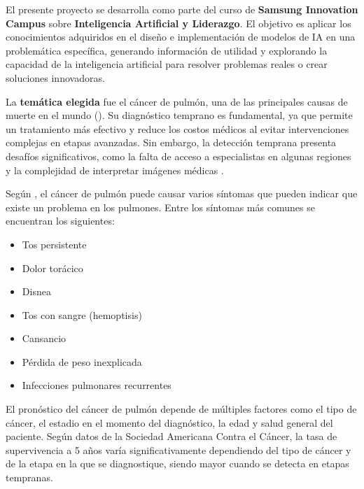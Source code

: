 El presente proyecto se desarrolla como parte del curso de \textbf{Samsung Innovation Campus} sobre \textbf{Inteligencia Artificial y Liderazgo}. El objetivo es aplicar los conocimientos adquiridos en el diseño e implementación de modelos de IA en una problemática específica, generando información de utilidad y explorando la capacidad de la inteligencia artificial para resolver problemas reales o crear soluciones innovadoras.

La \textbf{temática elegida} fue el cáncer de pulmón, una de las principales causas de muerte en el mundo (\cite{WHO2025}). Su diagnóstico temprano es fundamental, ya que permite un tratamiento más efectivo y reduce los costos médicos al evitar intervenciones complejas en etapas avanzadas. Sin embargo, la detección temprana presenta desafíos significativos, como la falta de acceso a especialistas en algunas regiones y la complejidad de interpretar imágenes médicas \parencite{OMS2017diagnosis}.


Según \textcite{MNT2025}, el cáncer de pulmón puede causar varios síntomas que pueden indicar que existe un problema en los pulmones.
Entre los síntomas más comunes se encuentran los siguientes:

\begin{itemize}
    \item Tos persistente
    \item Dolor torácico
    \item Disnea
    \item Tos con sangre (hemoptisis)
    \item Cansancio
    \item Pérdida de peso inexplicada
    \item Infecciones pulmonares recurrentes
\end{itemize}


El pronóstico del cáncer de pulmón depende de múltiples factores como el tipo de cáncer, el estadio en el momento del diagnóstico, la edad y salud general del paciente. Según datos de la Sociedad Americana Contra el Cáncer\parencite{ACS2025}, la tasa de supervivencia a 5 años varía significativamente dependiendo del tipo de cáncer y de la etapa en la que se diagnostique, siendo mayor cuando se detecta en etapas tempranas.

